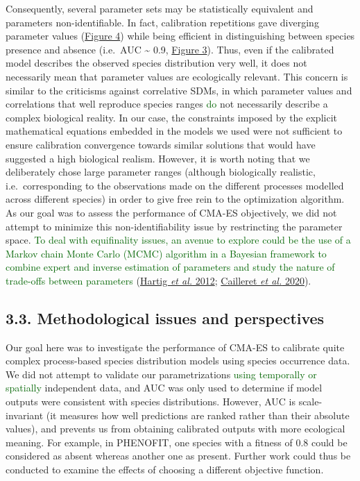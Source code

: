 \documentclass[11pt,]{article}
\begin{document}
Consequently, several parameter sets may be statistically equivalent and
parameters non-identifiable. In fact, calibration repetitions gave
diverging parameter values (\hyperref[fig:unfoldingplots]{Figure 4})
while being efficient in distinguishing between species presence and
absence (i.e.~AUC \textasciitilde{} 0.9,
\hyperref[fig:cmaesrepAUCcal]{Figure 3}). Thus, even if the calibrated
model describes the observed species distribution very well, it does not
necessarily mean that parameter values are ecologically relevant. This
concern is similar to the criticisms against correlative SDMs, in which
parameter values and correlations that well reproduce species ranges
\textcolor{darkgreen}{do} not necessarily describe a complex biological
reality. In our case, the constraints imposed by the explicit
mathematical equations embedded in the models we used were not
sufficient to ensure calibration convergence towards similar solutions
that would have suggested a high biological realism. However, it is
worth noting that we deliberately chose large parameter ranges (although
biologically realistic, i.e.~corresponding to the observations made on
the different processes modelled across different species) in order to
give free rein to the optimization algorithm. As our goal was to assess
the performance of CMA-ES objectively, we did not attempt to minimize
this non-identifiability issue by restrincting the parameter space.
\textcolor{darkgreen}{To deal with equifinality issues, an avenue to explore could be the use of a Markov chain Monte Carlo (MCMC) algorithm in a Bayesian framework to combine expert and inverse estimation of parameters and study the nature of trade-offs between parameters}
(\protect\hyperlink{ref-Hartig2012}{Hartig \emph{et al.} 2012};
\protect\hyperlink{ref-Cailleret2020}{Cailleret \emph{et al.} 2020}).

\hypertarget{methodological-issues-and-perspectives}{%
\subsection{3.3. Methodological issues and
perspectives}\label{methodological-issues-and-perspectives}}

Our goal here was to investigate the performance of CMA-ES to calibrate
quite complex process-based species distribution models using species
occurrence data. We did not attempt to validate our parametrizations
\textcolor{darkgreen}{using temporally or spatially} independent data,
and AUC was only used to determine if model outputs were consistent with
species distributions. However, AUC is scale-invariant (it measures how
well predictions are ranked rather than their absolute values), and
prevents us from obtaining calibrated outputs with more ecological
meaning. For example, in PHENOFIT, one species with a fitness of \(0.8\)
could be considered as absent whereas another one as present. Further
work could thus be conducted to examine the effects of choosing a
different objective function.
\end{document}
